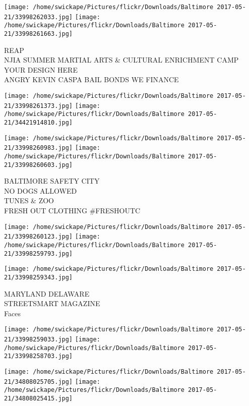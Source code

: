 \documentclass[10pt,letterpaper]{article}
\begin{document}
\texttt{[image: /home/swickape/Pictures/flickr/Downloads/Baltimore 2017-05-21/33998262033.jpg]}
\texttt{[image: /home/swickape/Pictures/flickr/Downloads/Baltimore 2017-05-21/33998261663.jpg]}

REAP\\
NJIA SUMMER MARTIAL ARTS \& CULTURAL ENRICHMENT CAMP\\
YOUR DESIGN HERE\\
ANGRY KEVIN CASPA BAIL BONDS WE FINANCE\\
\pagebreak

\texttt{[image: /home/swickape/Pictures/flickr/Downloads/Baltimore 2017-05-21/33998261373.jpg]}
\texttt{[image: /home/swickape/Pictures/flickr/Downloads/Baltimore 2017-05-21/34421914810.jpg]}

\texttt{[image: /home/swickape/Pictures/flickr/Downloads/Baltimore 2017-05-21/33998260983.jpg]}
\texttt{[image: /home/swickape/Pictures/flickr/Downloads/Baltimore 2017-05-21/33998260603.jpg]}

BALTIMORE SAFETY CITY\\
NO DOGS ALLOWED\\
TUNES \& ZOO\\
FRESH OUT CLOTHING \#FRESHOUTC\\
\pagebreak

\texttt{[image: /home/swickape/Pictures/flickr/Downloads/Baltimore 2017-05-21/33998260123.jpg]}
\texttt{[image: /home/swickape/Pictures/flickr/Downloads/Baltimore 2017-05-21/33998259793.jpg]}

\vspace{0.25in}
\texttt{[image: /home/swickape/Pictures/flickr/Downloads/Baltimore 2017-05-21/33998259343.jpg]}

MARYLAND DELAWARE\\
STREETSMART MAGAZINE\\
Faces\\
\pagebreak

\texttt{[image: /home/swickape/Pictures/flickr/Downloads/Baltimore 2017-05-21/33998259033.jpg]}
\texttt{[image: /home/swickape/Pictures/flickr/Downloads/Baltimore 2017-05-21/33998258703.jpg]}

\texttt{[image: /home/swickape/Pictures/flickr/Downloads/Baltimore 2017-05-21/34808025705.jpg]}
\texttt{[image: /home/swickape/Pictures/flickr/Downloads/Baltimore 2017-05-21/34808025415.jpg]}
\end{document}

